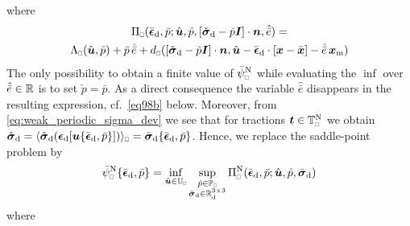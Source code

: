 \documentclass{bmcart}
\newcommand{\eqtref}[1]{\eqref{#1}}
\DeclarePairedDelimiter{\homgen}{\langle}{\rangle_\rve}
\renewcommand{\dev}{\mathrm{d}}
\newcommand{\epspargs}{\{{\bar{\ts\epsilon}}_\dev, \bar{p}\}}
\newcommand{\rve}{
  {\mathchoice
   {\mbox{\scalebox{0.67}{$\Box$}}}
   {\mbox{\scalebox{0.67}{$\Box$}}}
   {\mbox{\scalebox{0.5}{$\Box$}}}
   {\mbox{\scalebox{0.375}{$\Box$}}}
  }
}
\begin{document}
where
\begin{multline}
    \Pi_\rve(\bar{\ts\epsilon}_\dev,\bar{p};\hat{\ta{u}},\hat{p},\left[\check{\ts\sigma}_\dev-\check{p}\ts{I}\right]\cdot\ta{n},\hat{\bar{e}})
    =
\\
    \Lambda_\rve(\hat{\ta{u}},\hat{p}) + \bar{p}\,\hat{\bar{e}} +
    d_\rve(\left[\check{\ts\sigma}_\dev-\check{p}\ts{I}\right]\cdot\ta{n},\hat{\ta{u}}-\bar{\ts\epsilon}_\dev\cdot
    [\ta{x}-\bar{\ta{x}}]-\hat{\bar{e}}\,\ta{x}_\mean)
\label{eq96b}
\end{multline}
The only possibility to obtain a finite value of $\bar{\psi}_\rve^\Neumann$ while evaluating the $\inf$ over $\hat{\bar{e}}\in\mathbb{R}$ is to set $\check{p} = \bar{p}$.
As a direct consequence the variable $\hat{\bar{e}}$ disappears in the resulting expression, cf.\ \eqtref{eq98b} below.
Moreover, from \eqtref{eq:weak_periodic_sigma_dev} we see that for tractions $\ta t \in \set T_\rve^\Neumann$ we obtain $\check{\ts\sigma}_\dev
= \homgen{ \hat{\ts{\sigma}}_\dev(\ts{\epsilon}_\dev[\ta{u}\epspargs]) } = \bar{\ts\sigma}_\dev\epspargs$.
Hence, we replace the saddle-point problem by
\begin{align}
    \bar{\psi}_\rve^\Neumann\epspargs =
    \inf_{
    \hat{\ta{u}}\in\set{U}_\rve
    }
    \sup_{\substack{
    \hat{p}\in\set{P}_\rve \\
    \bar{\ts\sigma}_\dev\in\set{R}^{3\times3}_\dev
    }}
    \Pi_\rve^\Neumann(\bar{\ts\epsilon}_\dev,\bar{p};\hat{\ta{u}},\hat{p},\bar{\ts\sigma}_\dev)
\label{eq98a}
\end{align}
where
\end{document}
